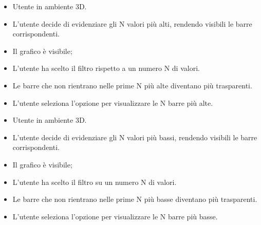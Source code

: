 \UCdsc
{ %
    \begin{itemize}
        \item Utente in ambiente 3D.
    \end{itemize}
}
{ %
    \begin{itemize}
        \item L'utente decide di evidenziare gli N valori più alti, rendendo visibili le barre corrispondenti.
    \end{itemize}
}
{ %
    \begin{itemize}
        \item Il grafico è visibile;
        \item L'utente ha scelto il filtro rispetto a un numero N di valori.
    \end{itemize}
}
{ %
    \begin{itemize}
        \item Le barre che non rientrano nelle prime N più alte diventano più trasparenti.
    \end{itemize}
}
{ %
    \begin{itemize}
        \item L'utente seleziona l'opzione per visualizzare le N barre più alte.
    \end{itemize}
}

\UCdsc
{ %
    \begin{itemize}
        \item Utente in ambiente 3D.
    \end{itemize}
}
{ %
    \begin{itemize}
        \item L'utente decide di evidenziare gli N valori più bassi, rendendo visibili le barre corrispondenti.
    \end{itemize}
}
{ %
    \begin{itemize}
        \item Il grafico è visibile;
        \item L'utente ha scelto il filtro su un numero N di valori.
    \end{itemize}
}
{ %
    \begin{itemize}
        \item Le barre che non rientrano nelle prime N più basse diventano più trasparenti.
    \end{itemize}
}
{ %
    \begin{itemize}
        \item L'utente seleziona l'opzione per visualizzare le N barre più basse.
    \end{itemize}
}


